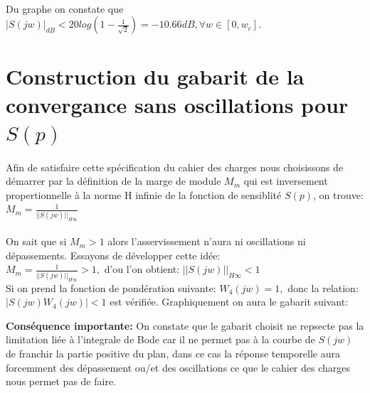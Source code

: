 \documentclass[12pt, a4paper, openany]{report}
\begin{document}
  \paragraph{}
  Du graphe on constate que $|S(jw)|_{dB} < 20log(1-\frac{1}{\sqrt{2}}) = -10.66dB, \forall w\in[0, w_{c}]$. 
  
 \section{Construction du gabarit de la convergance sans oscillations pour $S(p)$} 
  
  \paragraph{}
  Afin de satisfaire cette spécification du cahier des charges nous choisissons de démarrer par la définition de la marge de module $M_{m} $ qui est inversement propertionnelle à la norme H infinie de la fonction de sensiblité $S(p) $, on trouve: $M_{m}=\frac{1}{||S(jw)||_{H\infty}} $ 
 
  \paragraph{}
  On sait que si $ M_{m} > 1 $ alors l'asservissement n'aura ni oscillations ni dépassements. Essayons de développer cette idée: \\
  $M_{m}=\frac{1}{||S(jw)||_{H\infty}} > 1, $ d'ou l'on obtient: \hspace{1mm} $||S(jw)||_{H\infty}<1$ \\
  Si on prend la fonction de pondération suivante: \hspace{1mm} $W_{4}(jw)=1, $ donc la relation: \hspace{1mm} $|S(jw)W_{4}(jw)|<1 $ \hspace{1mm} est vérifiée. Graphiquement on aura le gabarit suivant:\\ 
  
  \begin{center}
    \label{fig7}
  \end{center}  
  
  \textbf{Conséquence importante:} \hspace{2mm} On constate que le gabarit choisit ne repsecte pas la limitation liée à l'integrale de Bode car il ne permet pas à la courbe de $S(jw) $ de franchir la partie positive du plan, dans ce cas la réponse temporelle aura forcemment des dépassement ou/et des oscillations ce que le cahier des charges nous permet pas de faire.\\
  
\end{document}
